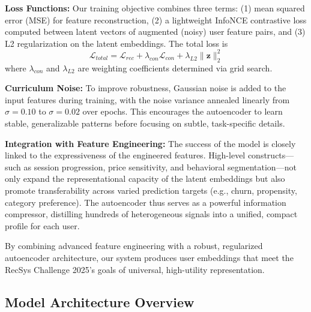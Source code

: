 \documentclass[sigconf]{acmart}
\begin{document}
\textbf{Loss Functions:}  
Our training objective combines three terms: (1) mean squared error (MSE) for feature reconstruction, (2) a lightweight InfoNCE contrastive loss computed between latent vectors of augmented (noisy) user feature pairs, and (3) L2 regularization on the latent embeddings. The total loss is  
\[
\mathcal{L}_{total} = \mathcal{L}_{rec} + \lambda_{con}\mathcal{L}_{con} + \lambda_{L2}\|\mathbf{z}\|_2^2
\]  
where $\lambda_{con}$ and $\lambda_{L2}$ are weighting coefficients determined via grid search.

\textbf{Curriculum Noise:}  
To improve robustness, Gaussian noise is added to the input features during training, with the noise variance annealed linearly from $\sigma=0.10$ to $\sigma=0.02$ over epochs. This encourages the autoencoder to learn stable, generalizable patterns before focusing on subtle, task-specific details.

\textbf{Integration with Feature Engineering:}  
The success of the model is closely linked to the expressiveness of the engineered features. High-level constructs—such as session progression, price sensitivity, and behavioral segmentation—not only expand the representational capacity of the latent embeddings but also promote transferability across varied prediction targets (e.g., churn, propensity, category preference). The autoencoder thus serves as a powerful information compressor, distilling hundreds of heterogeneous signals into a unified, compact profile for each user.

By combining advanced feature engineering with a robust, regularized autoencoder architecture, our system produces user embeddings that meet the RecSys Challenge 2025’s goals of universal, high-utility representation.

\subsection{Model Architecture Overview}
\end{document}
